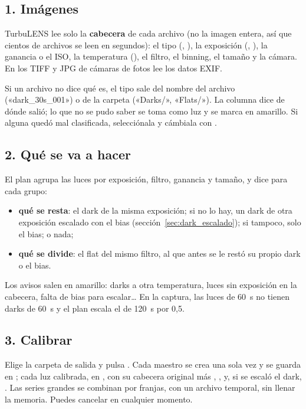 \subsection{1. Imágenes}

TurbuLENS lee solo la \textbf{cabecera} de cada archivo (no la imagen entera, así que cientos de archivos se leen en
segundos): el tipo (, ), la exposición (, ), la ganancia o
el ISO, la temperatura (), el filtro, el binning, el tamaño y la cámara. En los TIFF y JPG de cámaras de
fotos lee los datos EXIF.

Si un archivo no dice qué es, el tipo sale del nombre del archivo («dark\_30s\_001») o de la carpeta («Darks/»,
«Flats/»). La columna  dice de dónde salió; lo que no se pudo saber se toma como luz y se marca en amarillo.
Si alguna quedó mal clasificada, selecciónala y cámbiala con .

\subsection{2. Qué se va a hacer}

El plan agrupa las luces por exposición, filtro, ganancia y tamaño, y dice para cada grupo:
\begin{itemize}
\item \textbf{qué se resta}: el dark de la misma exposición; si no lo hay, un dark de otra exposición escalado con el
bias (sección~\ref{sec:dark_escalado}); si tampoco, solo el bias; o nada;
\item \textbf{qué se divide}: el flat del mismo filtro, al que antes se le restó su propio dark o el bias.
\end{itemize}
Los avisos salen en amarillo: darks a otra temperatura, luces sin exposición en la cabecera, falta de bias para
escalar\ldots{} En la captura, las luces de 60~s no tienen darks de 60~s y el plan escala el de 120~s por 0,5.

\subsection{3. Calibrar}

Elige la carpeta de salida y pulsa . Cada maestro se crea una sola vez y se guarda en
; cada luz calibrada, en , con su cabecera original más ,
,  y, si se escaló el dark, . Las series grandes se combinan por franjas, con
un archivo temporal, sin llenar la memoria. Puedes cancelar en cualquier momento.

